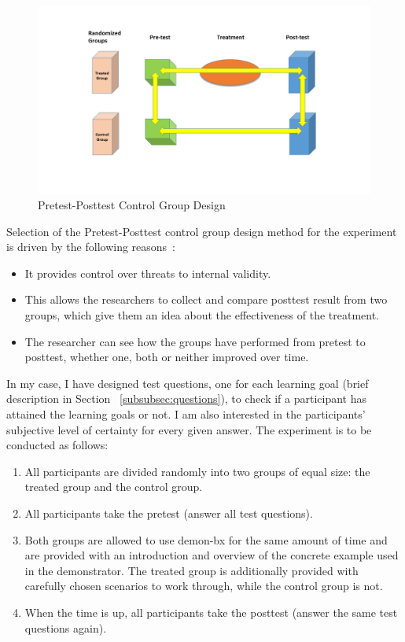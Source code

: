 \begin{figure}
	\includegraphics[width=1\textwidth]{figures/PrePost_Test}
	\caption{Pretest-Posttest Control Group Design }
	\label{fig:PrePost_Test}
\end{figure}

Selection of the Pretest-Posttest control group design method for the experiment is driven by the following reasons~\cite{anovapreposttest}:
\begin{itemize}
	\item It provides control over threats to internal validity.
	\item This allows the researchers to collect and compare posttest result from two groups, which give them an idea about the effectiveness of the treatment.
	\item The researcher can see how the groups have performed from pretest to posttest, whether one, both or neither improved over time.
\end{itemize}

In my case, I have designed test questions, one for each learning goal (brief description in Section~ \ref{subsubsec:questions}), to check if a participant has attained the learning goals or not. I am also interested in the participants' subjective level of certainty for every given answer. The experiment is to be conducted as follows:

\begin{enumerate}
	\item All participants are divided randomly into two groups of equal size: the treated group and the control group.
	\item All participants take the pretest (answer all test questions).
	\item Both groups are allowed to use demon-bx for the same amount of time and are provided with an introduction and overview of the concrete example used in the demonstrator.
	The treated group is additionally provided with carefully chosen scenarios to work through, while the control group is not.
	\item When the time is up, all participants take the posttest (answer the same test questions again).
\end{enumerate}


